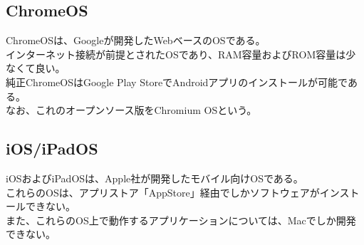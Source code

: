 \documentclass{ltjsarticle}
\begin{document}
\subsection{ChromeOS}
ChromeOSは、Googleが開発したWebベースのOSである。\\
インターネット接続が前提とされたOSであり、RAM容量およびROM容量は少なくて良い。\\
純正ChromeOSはGoogle Play StoreでAndroidアプリのインストールが可能である。\\
なお、これのオープンソース版をChromium OSという。
\subsection{iOS/iPadOS}
iOSおよびiPadOSは、Apple社が開発したモバイル向けOSである。\\
これらのOSは、アプリストア「AppStore」経由でしかソフトウェアがインストールできない。\\
また、これらのOS上で動作するアプリケーションについては、Macでしか開発できない。\\
\end{document}

